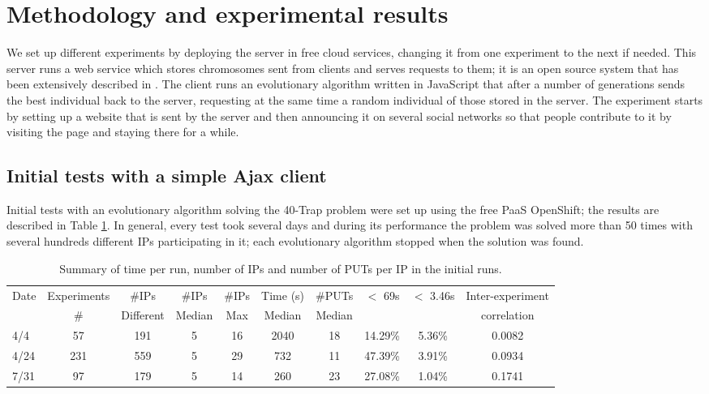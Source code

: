\documentclass{sig-alternate}
\begin{document}
\section{Methodology and experimental results}
\label{sec:exp1}


We set up different experiments by deploying the server in free cloud
services, changing it from one experiment to the next if needed. This server runs a web service
which stores chromosomes sent from clients and serves requests to
them; it is 
an open source system that has been extensively described in
\cite{2016arXiv160101607Manom}. The client runs an evolutionary
algorithm written in JavaScript that after a number of generations
sends the best individual back to the server, requesting at the same
time a random individual of those stored in the server. The experiment
starts by setting up a website that is sent by the server and then announcing it on several social
networks so that people contribute to it by visiting the page and
staying there for a while. 

\subsection{Initial tests with a simple Ajax client}


Initial tests with an evolutionary algorithm solving the 40-Trap
problem were set up using the free PaaS OpenShift; the results are described in
Table \ref{tab:summary:os}. In general, every test took several
days and during its performance the problem was solved more than 50 times with
several hundreds different IPs participating in it; each
evolutionary algorithm stopped when the solution was found. 
%
\begin{table}
\caption{Summary of time per run, number of IPs and number of PUTs per IP in the initial runs. \label{tab:summary:os}}
\begin{center}
\begin{tabular}{l|ccccccccc}
\hline
Date & Experiments &\#IPs &\#IPs &  \#IPs & Time (s) &  \#PUTs & $<$ 69s & $<$ 3.46s & Inter-experiment\\
     & \# & Different & Median & Max & Median &  Median & & & correlation \\ 
\hline
4/4 & 57 & 191 & 5 & 16 & 2040 & 18 & 14.29\% & 5.36\% & 0.0082 \\
4/24 & 231 & 559 & 5 & 29 & 732 & 11 & 47.39\% & 3.91\% & 0.0934\\
7/31 & 97 & 179 & 5 & 14 & 260 & 23 & 27.08\% & 1.04\%  & 0.1741\\
\hline
\end{tabular}
\end{center}
\end{table}
%
\end{document}
